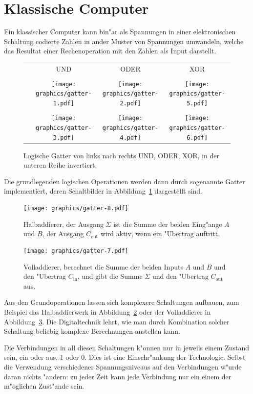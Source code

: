 \section{Klassische Computer}
Ein klassischer Computer kann bin"ar als Spannungen in einer
elektronischen Schaltung codierte Zahlen in ander Muster von
Spannungen umwandeln, welche das Resultat einer Rechenoperation
mit den Zahlen als Input darstellt.
\begin{figure}
\centering
\begin{tabular}{cccc}
&UND&ODER&XOR\\
\\
&
\texttt{[image: graphics/gatter-1.pdf]}&%
\texttt{[image: graphics/gatter-2.pdf]}&%
\texttt{[image: graphics/gatter-5.pdf]}
\\
\\
&
\texttt{[image: graphics/gatter-3.pdf]}&%
\texttt{[image: graphics/gatter-4.pdf]}&%
\texttt{[image: graphics/gatter-6.pdf]}
\end{tabular}
\caption{Logische Gatter von links nach rechts UND, ODER, XOR,
in der unteren Reihe invertiert.
\label{skript:gates}}
\end{figure}
Die grundlegenden logischen Operationen werden dann durch sogenannte
Gatter implementiert, deren Schaltbilder in Abbildung~\ref{skript:gates} dargestellt
sind.
\begin{figure}
\centering
\texttt{[image: graphics/gatter-8.pdf]}
\caption{Halbaddierer, der Ausgang $\Sigma$ ist die Summe der beiden
Eing"ange $A$ und $B$, der Ausgang $C_\text{out}$ wird aktiv, wenn
ein "Ubertrag auftritt.
\label{skript:halfadder}}
\end{figure}
\begin{figure}
\centering
\texttt{[image: graphics/gatter-7.pdf]}
\caption{Volladdierer, berechnet die Summe der beiden Inputs $A$ und $B$
und den "Ubertrag $C_\text{in}$, und gibt die Summe $\Sigma$ und den
"Ubertrag $C_\text{out}$ aus.
\label{skript:fulladder}}
\end{figure}
Aus den Grundoperationen lassen sich komplexere Schaltungen 
aufbauen, zum Beispiel das Halbaddierwerk in Abbildung~\ref{skript:halfadder}
oder der Volladdierer in Abbildung~\ref{skript:fulladder}.
Die Digitaltechnik lehrt, wie man durch Kombination solcher Schaltung
beliebig komplexe Berechnungen anstellen kann.

Die Verbindungen in all diesen Schaltungen k"onnen nur in jeweils einem
Zustand sein, ein oder aus, $1$ oder $0$.
Dies ist eine Einschr"ankung der Technologie.
Selbst die Verwendung verschiedener Spannungsniveaus auf den Verbindungen
w"urde daran nichts "andern: zu jeder Zeit kann jede Verbindung nur
ein einem der m"oglichen Zust"ande sein.

